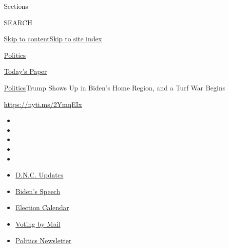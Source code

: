 Sections

SEARCH

\protect\hyperlink{site-content}{Skip to
content}\protect\hyperlink{site-index}{Skip to site index}

\href{https://www.nytimes3xbfgragh.onion/section/politics}{Politics}

\href{https://myaccount.nytimes3xbfgragh.onion/auth/login?response_type=cookie\&client_id=vi}{}

\href{https://www.nytimes3xbfgragh.onion/section/todayspaper}{Today's
Paper}

\href{/section/politics}{Politics}\textbar{}Trump Shows Up in Biden's
Home Region, and a Turf War Begins

\url{https://nyti.ms/2YmqEIx}

\begin{itemize}
\item
\item
\item
\item
\item
\end{itemize}

\begin{itemize}
\item
  \href{https://www.nytimes3xbfgragh.onion/live/2020/08/20/us/dnc-convention-election?action=click\&pgtype=Article\&state=default\&region=TOP_BANNER\&context=storylines_menu}{D.N.C.
  Updates}
\item
  \href{https://www.nytimes3xbfgragh.onion/2020/08/20/us/politics/biden-presidential-nomination-dnc.html?action=click\&pgtype=Article\&state=default\&region=TOP_BANNER\&context=storylines_menu}{Biden's
  Speech}
\item
  \href{https://www.nytimes3xbfgragh.onion/interactive/2019/us/elections/2020-presidential-election-calendar.html?action=click\&pgtype=Article\&state=default\&region=TOP_BANNER\&context=storylines_menu}{Election
  Calendar}
\item
  \href{https://www.nytimes3xbfgragh.onion/interactive/2020/08/11/us/politics/vote-by-mail-us-states.html?action=click\&pgtype=Article\&state=default\&region=TOP_BANNER\&context=storylines_menu}{Voting
  by Mail}
\item
  \href{https://www.nytimes3xbfgragh.onion/newsletters/politics?action=click\&pgtype=Article\&state=default\&region=TOP_BANNER\&context=storylines_menu}{Politics
  Newsletter}
\end{itemize}

